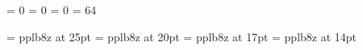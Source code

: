 

\newcount\nsec		\nsec		= 0
\newcount\nsubsec  	\nsubsec 	= 0
\newcount\nssubsec	\nssubsec	= 0
\newcount\napp		\napp		= 64


\def\layoutpage{
	\footline={\hfil \rm \the\pageno \hfil}
	\def\makeheadline{}
	}

\def\plainpage{\footline={}\def\makeheadline{}}



\font\fPbxxv	= pplb8z at 25pt
\font\fPbxx	 	= pplb8z at 20pt
\font\fPbxvii 	= pplb8z at 17pt
\font\fPbxiv 	= pplb8z at 14pt




\newif\ifNumberSections

\def\sref#1{\safecom{sec:#1}}

\def\title#1{\penalty-\clubpenalty\vskip3\baselineskip{\baselineskip24pt\vbox{\noindent\fPbxx #1}}\penalty\clubpenalty\vskip\baselineskip}

\def\section{\IfNch[{\sectionRef}{\sectionBase}}
\def\sectionRef[#1]#2{\sectionBase{#2}\MakeRef{sec:#1}{\the\nsec}}
\def\sectionBase#1{%
	\advance\nsec1 \nsubsec=0  \nssubsec=0%
	\penalty-\clubpenalty\vskip2\baselineskip{\baselineskip15pt\vbox{%
		\noindent\SetFontSizesXII\bf\ifNumberSections\the\nsec. \fi #1%
	}}\penalty\clubpenalty\vskip\baselineskip
	\parindent = 0pt \everypar={\parindent=\ParIndent \everypar={}}%
	}

\def\subsection#1{%
	\advance\nsubsec1  \nssubsec=0%
	\penalty-\clubpenalty\vskip2\baselineskip{\baselineskip15pt\vbox{%
		\noindent\bf\ifNumberSections\the\nsec.\the\nsubsec. \fi #1%
	}}\penalty\clubpenalty\vskip\baselineskip
	\parindent = 0pt \everypar={\parindent=\ParIndent \everypar={}}%
}


